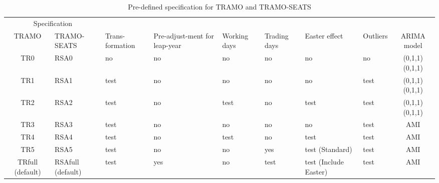 \documentclass[article]{jss}
\begin{document}
\begin{table}[t]

\caption{\label{tab:pre_def_ts}Pre-defined specification for TRAMO and TRAMO-SEATS}
\centering
\fontsize{7}{9}\selectfont
\begin{tabular}{c>{\centering\arraybackslash}p{}>{\centering\arraybackslash}p{}>{\centering\arraybackslash}p{1.5cm}>{\centering\arraybackslash}p{0.9cm}>{\centering\arraybackslash}p{0.9cm}>{\centering\arraybackslash}p{1.5cm}>{\centering\arraybackslash}p{0.9cm}c}
\toprule
\multicolumn{2}{c}{Specification} & \multicolumn{1}{c}{} \\
\cmidrule(l{3pt}r{3pt}){1-2}
TRAMO & TRAMO-SEATS & Trans-formation & Pre-adjust-ment for leap-year & Working days & Trading days & Easter effect & Outliers & ARIMA model\\
\midrule
TR0 & RSA0 & no & no & no & no & no & no & (0,1,1)(0,1,1)\\
TR1 & RSA1 & test & no & no & no & no & test & (0,1,1)(0,1,1)\\
TR2 & RSA2 & test & no & test & no & test & test & (0,1,1)(0,1,1)\\
TR3 & RSA3 & test & no & no & no & no & test & AMI\\
TR4 & RSA4 & test & no & test & no & test & test & AMI\\
\addlinespace
TR5 & RSA5 & test & no & no & yes & test (Standard) & test & AMI\\
TRfull (default) & RSAfull (default) & test & yes & no & test & test (Include Easter) & test & AMI\\
\bottomrule
\end{tabular}
\end{table}
\end{document}
